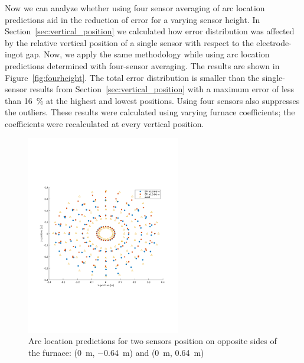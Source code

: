 \documentclass[onehalf,11pt]{beavtex}
\begin{document}
Now we can analyze whether using four sensor averaging of arc location predictions aid in the reduction of error for a varying sensor height.
In Section~\ref{sec:vertical_position} we calculated how error distribution was affected by the relative vertical position of a single sensor with respect to the electrode-ingot gap. 
Now, we apply the same methodology while using arc location predictions determined with four-sensor averaging. 
The results are shown in Figure~\ref{fig:fourheight}. 
The total error distribution is smaller than the single-sensor results from Section~\ref{sec:vertical_position} with a maximum error of less than \SI{16}{\percent} at the highest and lowest positions. 
Using four sensors also suppresses the outliers.
These results were calculated using varying furnace coefficients; the coefficients were recalculated at every vertical position.

\begin{figure}[htbp]
\centering
	\includegraphics[width=0.6\textwidth]{senspos.pdf}
	\caption{Arc location predictions for two sensors position on opposite sides of the furnace: (\SI{0}{\meter}, \SI{-0.64}{\meter}) and (\SI{0}{\meter}, \SI{0.64}{\meter})}
	\label{fig:two_sensors}
\end{figure}
\end{document}
